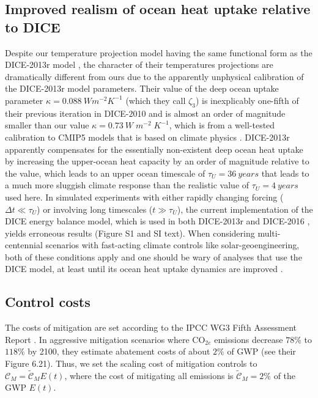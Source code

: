 \documentclass[9pt,twocolumn,twoside,lineno]{pnas-new}
\begin{document}
{\subsection*{Improved realism of ocean heat uptake relative to DICE}
Despite our temperature projection model having the same functional form as the DICE-2013r model \cite{nordhaus2013dice}, the character of their temperatures projections are dramatically different from ours due to the apparently unphysical calibration of the DICE-2013r model parameters. Their value of the deep ocean uptake parameter $\kappa = \SI{0.088}{W m^{-2} K^{-1}}$ (which they call $\zeta_{3}$) is inexplicably one-fifth of their previous iteration in DICE-2010 \cite{calel_physics_2016} and is almost an order of magnitude smaller than our value $\kappa = \SI{0.73}{W\; m^{-2}\; K^{-1}}$, which is from a well-tested calibration to CMIP5 models that is based on climate physics \cite{geoffroy_transient_2012}. DICE-2013r apparently compensates for the essentially non-existent deep ocean heat uptake by increasing the upper-ocean heat capacity by an order of magnitude relative to the \cite{geoffroy_transient_2012} value, which leads to an upper ocean timescale of $\tau_{U} = \SI{36}{years}$ that leads to a much more sluggish climate response than the realistic value of $\tau_{U} = \SI{4}{years}$ used here. In simulated experiments with either rapidly changing forcing ($\Delta t \ll \tau_{U}$) or involving long timescales ($t \gg \tau_{U}$), the current implementation of the DICE energy balance model, which is used in both DICE-2013r \cite{nordhaus2013dice} and DICE-2016 \cite{nordhaus_revisiting_2017}, yields erroneous results (Figure S1 and SI text). When considering multi-centennial scenarios with fast-acting climate controls like solar-geoengineering, both of these conditions apply and one should be wary of analyses that use the DICE model, at least until its ocean heat uptake dynamics are improved \cite{calel_physics_2016}.

\subsection*{Control costs}
The costs of mitigation are set according to the IPCC WG3 Fifth Assessment Report \cite{}. In aggressive mitigation scenarios where CO$_{2e}$ emissions decrease $78\%$ to $118\%$ by 2100, they estimate abatement costs of about $2\%$ of GWP (see their Figure 6.21). Thus, we set the scaling cost of mitigation controls to $\mathcal{C}_{M} = \tilde{\mathcal{C}}_{M} E(t)$, where the cost of mitigating all emissions is $\tilde{\mathcal{C}}_{M} = 2\%$ of the GWP $E(t)$.

}
\end{document}
